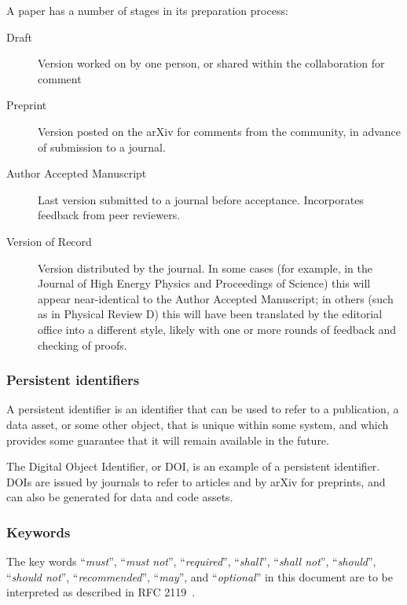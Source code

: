 \documentclass{article}
\newcommand\rfcword[1]{\emph{#1}\xspace}
\newcommand\must{\rfcword{must}}
\newcommand\mustnot{\rfcword{must not}}
\newcommand\required{\rfcword{required}}
\newcommand\shall{\rfcword{shall}}
\newcommand\shallnot{\rfcword{shall not}}
\newcommand\should{\rfcword{should}}
\newcommand\shouldnot{\rfcword{should not}}
\newcommand\recommended{\rfcword{recommended}}
\newcommand\may{\rfcword{may}}
\newcommand\optional{\rfcword{optional}}
\begin{document}
A paper has a number of stages in its preparation process:

\begin{description}
  \item[Draft]
        Version worked on by one person,
        or shared within the collaboration for comment
  \item[Preprint]
        Version posted on the arXiv for comments from the community,
        in advance of submission to a journal.
  \item[Author Accepted Manuscript]
        Last version submitted to a journal before acceptance.
        Incorporates feedback from peer reviewers.
  \item[Version of Record]
        Version distributed by the journal.
        In some cases
        (for example,
        in the Journal of High Energy Physics
        and Proceedings of Science)
        this will appear near-identical to the Author Accepted Manuscript;
        in others
        (such as in Physical Review D)
        this will have been
        translated by the editorial office into a different style,
        likely with one or more rounds of feedback
        and checking of proofs.
\end{description}

\subsubsection{Persistent identifiers}

A persistent identifier is
an identifier that can be used to refer to
a publication,
a data asset,
or some other object,
that is unique within some system,
and which provides some guarantee that it will remain available in the future.

The Digital Object Identifier,
or DOI,
is an example of a persistent identifier.
DOIs are issued by journals to refer to articles
and by arXiv for preprints,
and can also be generated for data and code assets.


\subsubsection{Keywords}

The key words
``\must'',
``\mustnot'',
``\required'',
``\shall'',
``\shallnot'',
``\should'',
``\shouldnot'',
``\recommended'',
``\may'',
and ``\optional''
in this document are to be interpreted as described in RFC 2119~\cite{rfc2119}.
\end{document}
